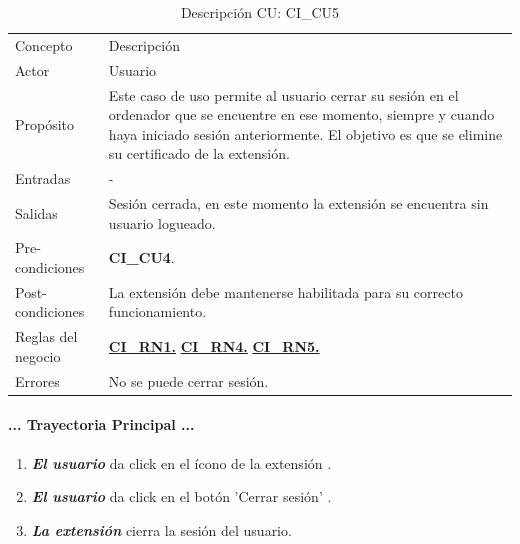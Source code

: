\documentclass[12pt, a4paper, titlepage]{report}
\newcommand*{\img}[1]{%
    \raisebox{-.3\baselineskip}{%
        \texttt{[image: \#1]}%
    }%
}
\begin{document}
			    
				\begin{table}[H]
    				\begin{tabular}{ |p{3.5cm}||p{9.5cm}|}
    					\hline
    					\rowcolor{guindapoli}
    					\multicolumn{2}{|c|}{\textbf{\textcolor{white}{Caso de uso: CI\_CU5. Cerrar sesión en la extensión.}}}\\
    					\hline
    					\rowcolor{azulfuerte}Concepto & Descripción\\
    					\hline
    					\cellcolor{azulclaro}Actor & 
    					Usuario\\ 
    					\hline
    					\cellcolor{azulclaro}Propósito &
    					Este caso de uso permite al usuario cerrar su sesión en el ordenador que se encuentre en ese momento, siempre y cuando haya iniciado sesión anteriormente. El objetivo es que se elimine su certificado de la extensión.\\
    					\hline
    					\cellcolor{azulclaro}Entradas &
    					-\\
    					\hline
    					\cellcolor{azulclaro}Salidas &
    					Sesión cerrada, en este momento la extensión se encuentra sin usuario logueado.\\
    					\hline
    					\cellcolor{azulclaro}Pre-condiciones&
    					\textbf{CI\_CU4}.\\
    					\hline
    					\cellcolor{azulclaro}Post-condiciones&
    					La extensión debe mantenerse habilitada para su correcto funcionamiento.\\
    					\hline
    					\cellcolor{azulclaro}Reglas del negocio&
    					\hyperref[CI_RN1]{\textbf{CI\_RN1.}} \newline \hyperref[CI_RN4]{\textbf{CI\_RN4.}} \newline
    					\hyperref[CI_RN5]{\textbf{CI\_RN5.}}\\
    					\hline
    					\cellcolor{azulclaro}Errores &
    					No se puede cerrar sesión.
    					\\					
    					\hline
    				\end{tabular}
				\caption[DCU: CI\_CU5]{Descripción CU: CI\_CU5}
				\end{table}
				
				\paragraph{... Trayectoria Principal ...}
				\begin{enumerate}
				
					\item \textbf{\textit{El usuario}} da click en el ícono de la extensión \img{imagenes/Disenio/Componente_1/UI_icon_escom.png}.
					
					\item \textbf{\textit{El usuario}} da click en el botón 'Cerrar sesión' \img{imagenes/Disenio/Componente_1/UI_btn_logout.png}.
					
					\item \textbf{\textit{La extensión}} cierra la sesión del usuario.
					
				\end{enumerate}
\end{document}
